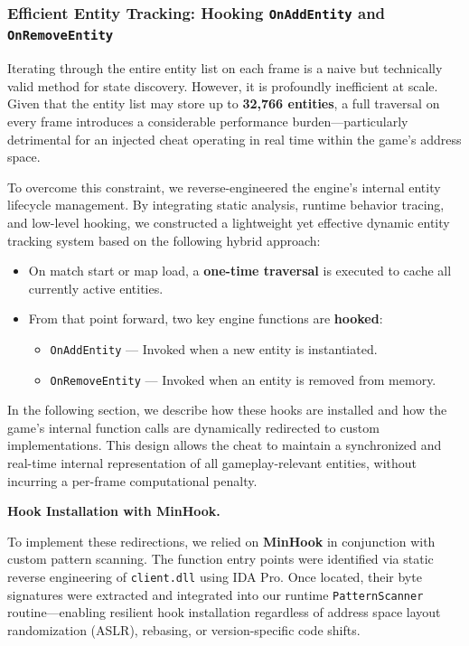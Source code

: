 \subsubsection{Efficient Entity Tracking: Hooking \texttt{OnAddEntity} and \texttt{OnRemoveEntity}}

Iterating through the entire entity list on each frame is a naive but technically valid method for state discovery. However, it is profoundly inefficient at scale.  
Given that the entity list may store up to \textbf{32,766 entities}, a full traversal on every frame introduces a considerable performance burden—particularly detrimental for an injected cheat operating in real time within the game’s address space.

To overcome this constraint, we reverse-engineered the engine’s internal entity lifecycle management.  
By integrating static analysis, runtime behavior tracing, and low-level hooking, we constructed a lightweight yet effective dynamic entity tracking system based on the following hybrid approach:

\begin{itemize}
    \item On match start or map load, a \textbf{one-time traversal} is executed to cache all currently active entities.
    \item From that point forward, two key engine functions are \textbf{hooked}:
    \begin{itemize}
        \item \texttt{OnAddEntity} — Invoked when a new entity is instantiated.
        \item \texttt{OnRemoveEntity} — Invoked when an entity is removed from memory.
    \end{itemize}
\end{itemize}

In the following section, we describe how these hooks are installed and how the game’s internal function calls are dynamically redirected to custom implementations.  
This design allows the cheat to maintain a synchronized and real-time internal representation of all gameplay-relevant entities, without incurring a per-frame computational penalty.


\newpage


\noindent\textbf{Hook Installation with MinHook.}

To implement these redirections, we relied on \textbf{MinHook} in conjunction with custom pattern scanning.  
The function entry points were identified via static reverse engineering of \texttt{client.dll} using IDA Pro. Once located, their byte signatures were extracted and integrated into our runtime \texttt{PatternScanner} routine—enabling resilient hook installation regardless of address space layout randomization (ASLR), rebasing, or version-specific code shifts.

